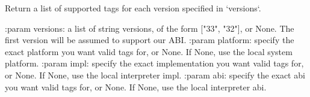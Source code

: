 \begin{DoxyVerb}Return a list of supported tags for each version specified in
`versions`.

:param versions: a list of string versions, of the form ["33", "32"],
    or None. The first version will be assumed to support our ABI.
:param platform: specify the exact platform you want valid
    tags for, or None. If None, use the local system platform.
:param impl: specify the exact implementation you want valid
    tags for, or None. If None, use the local interpreter impl.
:param abi: specify the exact abi you want valid
    tags for, or None. If None, use the local interpreter abi.
\end{DoxyVerb}
 